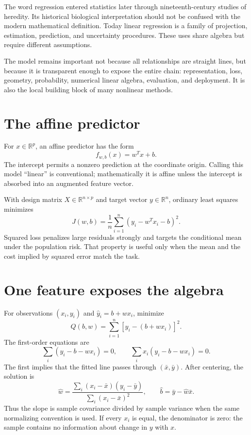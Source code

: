 The word regression entered statistics later through nineteenth-century studies
of heredity. Its historical biological interpretation should not be confused
with the modern mathematical definition. Today linear regression is a family
of projection, estimation, prediction, and uncertainty procedures. These uses
share algebra but require different assumptions.

The model remains important not because all relationships are straight lines,
but because it is transparent enough to expose the entire chain: representation,
loss, geometry, probability, numerical linear algebra, evaluation, and
deployment. It is also the local building block of many nonlinear methods.

\section{The affine predictor}

For $x\in\mathbb{R}^p$, an affine predictor has the form
\[
f_{w,b}(x)=w^Tx+b.
\]
The intercept permits a nonzero prediction at the coordinate origin. Calling
this model ``linear'' is conventional; mathematically it is affine unless the
intercept is absorbed into an augmented feature vector.

With design matrix $X\in\mathbb{R}^{n\times p}$ and target vector
$y\in\mathbb{R}^n$, ordinary least squares minimizes
\[
J(w,b)=\frac{1}{n}\sum_{i=1}^n(y_i-w^Tx_i-b)^2.
\]
Squared loss penalizes large residuals strongly and targets the conditional mean
under the population risk. That property is useful only when the mean and the
cost implied by squared error match the task.

\section{One feature exposes the algebra}

For observations $(x_i,y_i)$ and $\widehat y_i=b+wx_i$, minimize
\[
Q(b,w)=\sum_{i=1}^n[y_i-(b+wx_i)]^2.
\]
The first-order equations are
\[
\sum_i(y_i-b-wx_i)=0,
\qquad
\sum_i x_i(y_i-b-wx_i)=0.
\]
The first implies that the fitted line passes through $(\bar x,\bar y)$. After
centering, the solution is
\[
\widehat w=
\frac{\sum_i(x_i-\bar x)(y_i-\bar y)}
     {\sum_i(x_i-\bar x)^2},
\qquad
\widehat b=\bar y-\widehat w\bar x.
\]
Thus the slope is sample covariance divided by sample variance when the same
normalizing convention is used. If every $x_i$ is equal, the denominator is
zero: the sample contains no information about change in $y$ with $x$.

